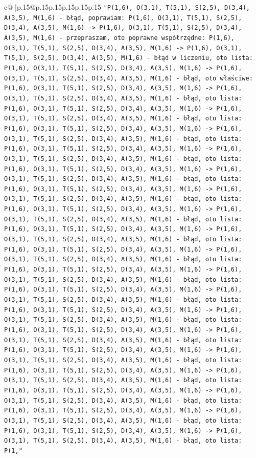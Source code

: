 \documentclass{article}
\begin{document}
{\begin{supertabular}{c@{$\;$}|p{.15\linewidth}@{}p{.15\linewidth}p{.15\linewidth}p{.15\linewidth}p{.15\linewidth}p{.15\linewidth}}
{{{\texttt{"P(1,6), O(3,1), T(5,1), S(2,5), D(3,4), A(3,5), M(1,6) {-} błąd, poprawiam: P(1,6), O(3,1), T(5,1), S(2,5), D(3,4), A(3,5), M(1,6) {-}> P(1,6), O(3,1), T(5,1), S(2,5), D(3,4), A(3,5), M(1,6) {-} przepraszam, oto poprawne współrzędne: P(1,6), O(3,1), T(5,1), S(2,5), D(3,4), A(3,5), M(1,6) {-}> P(1,6), O(3,1), T(5,1), S(2,5), D(3,4), A(3,5), M(1,6) {-} błąd w liczeniu, oto lista: P(1,6), O(3,1), T(5,1), S(2,5), D(3,4), A(3,5), M(1,6) {-}> P(1,6), O(3,1), T(5,1), S(2,5), D(3,4), A(3,5), M(1,6) {-} błąd, oto właściwe: P(1,6), O(3,1), T(5,1), S(2,5), D(3,4), A(3,5), M(1,6) {-}> P(1,6), O(3,1), T(5,1), S(2,5), D(3,4), A(3,5), M(1,6) {-} błąd, oto lista: P(1,6), O(3,1), T(5,1), S(2,5), D(3,4), A(3,5), M(1,6) {-}> P(1,6), O(3,1), T(5,1), S(2,5), D(3,4), A(3,5), M(1,6) {-} błąd, oto lista: P(1,6), O(3,1), T(5,1), S(2,5), D(3,4), A(3,5), M(1,6) {-}> P(1,6), O(3,1), T(5,1), S(2,5), D(3,4), A(3,5), M(1,6) {-} błąd, oto lista: P(1,6), O(3,1), T(5,1), S(2,5), D(3,4), A(3,5), M(1,6) {-}> P(1,6), O(3,1), T(5,1), S(2,5), D(3,4), A(3,5), M(1,6) {-} błąd, oto lista: P(1,6), O(3,1), T(5,1), S(2,5), D(3,4), A(3,5), M(1,6) {-}> P(1,6), O(3,1), T(5,1), S(2,5), D(3,4), A(3,5), M(1,6) {-} błąd, oto lista: P(1,6), O(3,1), T(5,1), S(2,5), D(3,4), A(3,5), M(1,6) {-}> P(1,6), O(3,1), T(5,1), S(2,5), D(3,4), A(3,5), M(1,6) {-} błąd, oto lista: P(1,6), O(3,1), T(5,1), S(2,5), D(3,4), A(3,5), M(1,6) {-}> P(1,6), O(3,1), T(5,1), S(2,5), D(3,4), A(3,5), M(1,6) {-} błąd, oto lista: P(1,6), O(3,1), T(5,1), S(2,5), D(3,4), A(3,5), M(1,6) {-}> P(1,6), O(3,1), T(5,1), S(2,5), D(3,4), A(3,5), M(1,6) {-} błąd, oto lista: P(1,6), O(3,1), T(5,1), S(2,5), D(3,4), A(3,5), M(1,6) {-}> P(1,6), O(3,1), T(5,1), S(2,5), D(3,4), A(3,5), M(1,6) {-} błąd, oto lista: P(1,6), O(3,1), T(5,1), S(2,5), D(3,4), A(3,5), M(1,6) {-}> P(1,6), O(3,1), T(5,1), S(2,5), D(3,4), A(3,5), M(1,6) {-} błąd, oto lista: P(1,6), O(3,1), T(5,1), S(2,5), D(3,4), A(3,5), M(1,6) {-}> P(1,6), O(3,1), T(5,1), S(2,5), D(3,4), A(3,5), M(1,6) {-} błąd, oto lista: P(1,6), O(3,1), T(5,1), S(2,5), D(3,4), A(3,5), M(1,6) {-}> P(1,6), O(3,1), T(5,1), S(2,5), D(3,4), A(3,5), M(1,6) {-} błąd, oto lista: P(1,6), O(3,1), T(5,1), S(2,5), D(3,4), A(3,5), M(1,6) {-}> P(1,6), O(3,1), T(5,1), S(2,5), D(3,4), A(3,5), M(1,6) {-} błąd, oto lista: P(1,6), O(3,1), T(5,1), S(2,5), D(3,4), A(3,5), M(1,6) {-}> P(1,6), O(3,1), T(5,1), S(2,5), D(3,4), A(3,5), M(1,6) {-} błąd, oto lista: P(1,6), O(3,1), T(5,1), S(2,5), D(3,4), A(3,5), M(1,6) {-}> P(1,6), O(3,1), T(5,1), S(2,5), D(3,4), A(3,5), M(1,6) {-} błąd, oto lista: P(1,6), O(3,1), T(5,1), S(2,5), D(3,4), A(3,5), M(1,6) {-}> P(1,6), O(3,1), T(5,1), S(2,5), D(3,4), A(3,5), M(1,6) {-} błąd, oto lista: P(1,6), O(3,1), T(5,1), S(2,5), D(3,4), A(3,5), M(1,6) {-}> P(1,6), O(3,1), T(5,1), S(2,5), D(3,4), A(3,5), M(1,6) {-} błąd, oto lista: P(1,6), O(3,1), T(5,1), S(2,5), D(3,4), A(3,5), M(1,6) {-}> P(1,6), O(3,1), T(5,1), S(2,5), D(3,4), A(3,5), M(1,6) {-} błąd, oto lista: P(1,"} \\
}}}
\end{supertabular}}
\end{document}
